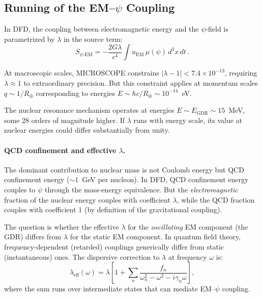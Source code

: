 \documentclass[aps,prd,twocolumn,superscriptaddress,nofootinbib]{revtex4-2}
\newcommand{\ee}[1]{\times 10^{#1}}
\newcommand{\mufunction}{\mu}
\newcommand{\lam}{\lambda}
\newcommand{\EGDR}{E_{\mathrm{GDR}}}
\begin{document}
\subsection{Running of the EM--$\psi$ Coupling}
\label{sec:lambda-running}

In DFD, the coupling between electromagnetic energy and the $\psi$-field
is parametrized by $\lam$ in the source term:
\begin{equation}
S_{\psi\text{-EM}} = -\frac{2G\lam}{c^4}\int u_{\mathrm{EM}}\,
\mufunction(\psi)\,d^3x\,dt\,.
\end{equation}

At macroscopic scales, MICROSCOPE constrains $|\lam - 1| < 7.4\ee{-13}$,
requiring $\lam \approx 1$ to extraordinary precision.  But this
constraint applies at momentum scales $q \sim 1/R_{\oplus}$
corresponding to energies $E \sim \hbar c/R_{\oplus} \sim 10^{-14}$~eV.

The nuclear resonance mechanism operates at energies $E \sim \EGDR
\sim 15$~MeV, some 28 orders of magnitude higher.  If $\lam$ runs
with energy scale, its value at nuclear energies could differ
substantially from unity.

\paragraph{QCD confinement and effective $\lam$.}
The dominant contribution to nuclear mass is not Coulomb energy but
QCD confinement energy ($\sim\!1$~GeV per nucleon).  In DFD, QCD
confinement energy couples to $\psi$ through the mass-energy
equivalence.  But the \emph{electromagnetic} fraction of the nuclear
energy couples with coefficient $\lam$, while the QCD fraction
couples with coefficient 1 (by definition of the gravitational
coupling).

The question is whether the effective $\lam$ for the
\emph{oscillating} EM component (the GDR) differs from $\lam$
for the static EM component.  In quantum field theory, frequency-dependent
(retarded) couplings generically differ from static (instantaneous)
ones.  The dispersive correction to $\lam$ at frequency $\omega$ is:
\begin{equation}\label{eq:lam-dispersive}
\lam_{\mathrm{eff}}(\omega) = \lam\left[1 +
\sum_n \frac{f_n}{\omega_n^2 - \omega^2 - i\gamma_n\omega}\right],
\end{equation}
where the sum runs over intermediate states that can mediate
EM--$\psi$ coupling.
\end{document}
